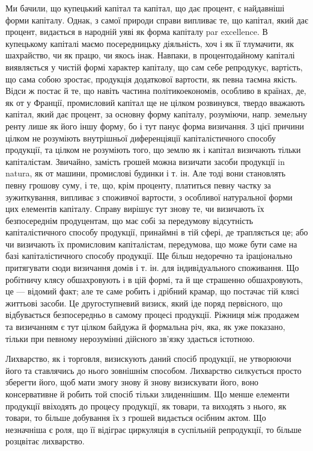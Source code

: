 Ми бачили, що купецький капітал та капітал, що дає процент, є найдавніші
форми капіталу. Однак, з самої природи справи випливає те, що капітал, який дає
процент, видається в народній уяві як форма капіталу par excellence. В купецькому
капіталі маємо посередницьку діяльність, хоч і як її тлумачити, як шахрайство, чи
як працю, чи якось інак. Навпаки, в процентодайному капіталі виявляється у чистій
формі характер капіталу, що сам себе репродукує, вартість, що сама собою зростає,
продукція додаткової вартости, як певна таємна якість. Відси ж постає й те, що
навіть частина політикоекономів, особливо в країнах, де, як от у Франції,
промисловий капітал ще не цілком розвинувся, твердо вважають капітал, який
дає процент, за основну форму капіталу, розуміючи, напр. земельну ренту
лише як його іншу форму, бо і тут панує форма визичання. З цієї причини
цілком не розуміють внутрішньої диференціяції капіталістичного способу продукції,
та цілком не розуміють того, що землю як і капітал визичають тільки
капіталістам. Звичайно, замість грошей можна визичати засоби продукції in natura,
як от машини, промислові будинки і т. ін. Але тоді вони становлять певну
грошову суму, і те, що, крім проценту, платиться певну частку за зужиткування,
випливає з споживчої вартости, з особливої натуральної форми цих елементів
капіталу. Справу вирішує тут знову те, чи визичають їх безпосереднім продуцентам,
що має собі за передумову відсутність капіталістичного способу продукції,
принаймні в тій сфері, де трапляється це; або чи визичають їх промисловим
капіталістам, передумова, що може бути саме на базі капіталістичного
способу продукції. Ще більш недоречно та іраціонально притягувати сюди визичання
домів і т. ін. для індивідуального споживання. Що робітничу клясу
обшахровують і в цій формі, та й ще страшенно обшахровують, це — відомий
факт; але те саме робить і дрібний крамар, що постачає тій клясі життьові
засоби. Це другоступневий визиск, який іде поряд первісного, що відбувається
безпосередньо в самому процесі продукції. Ріжниця між продажем та визичанням
є тут цілком байдужа й формальна річ, яка, як уже показано, тільки при
певному нерозумінні дійсного зв’язку здається істотною.

Лихварство, як і торговля, визискують даний спосіб продукції, не утворюючи
його та ставлячись до нього зовнішнім способом. Лихварство силкується
просто зберегти його, щоб мати змогу знову й знову визискувати його, воно консервативне
й робить той спосіб тільки злиденнішим. Що менше елементи продукції
ввіходять до процесу продукції, як товари, та виходять з нього, як товари,
то більше добування їх з грошей видається осібним актом. Що незначніша
є роля, що її відіграє циркуляція в суспільній репродукції, то більше розцвітає
лихварство.

